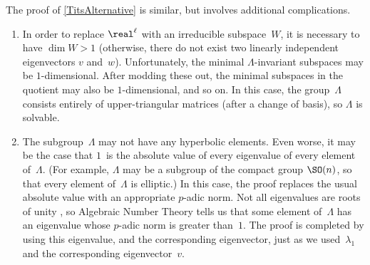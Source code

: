 \begin{rem}
 The proof of \cref{TitsAlternative} is similar, but
involves additional complications.
 \begin{enumerate}
 \item In order to replace $\real^\ell$ with an
irreducible subspace~$W$, it is necessary to have $\dim W >
1$ (otherwise, there do not exist two linearly independent
eigenvectors $v$ and~$w$). Unfortunately, the minimal
$\Lambda$-invariant subspaces may be $1$-dimensional. 
After modding these out, the minimal subspaces in the
quotient may also be $1$-dimensional, and so on. In this
case, the group~$\Lambda$ consists entirely of
upper-triangular matrices (after a change of basis), so
$\Lambda$ is solvable.
 \item The subgroup~$\Lambda$ may not have any hyperbolic
elements. Even worse, it may be the case that $1$~is the
absolute value of every eigenvalue of every element
of~$\Lambda$. (For example, $\Lambda$ may be a subgroup of
the compact group $\SO(n)$, so that every element
of~$\Lambda$ is elliptic.) In this case, the proof replaces the
usual absolute value with an appropriate $p$-adic norm.
Not all eigenvalues are roots of unity , so
Algebraic Number Theory tells us that some element
of~$\Lambda$ has an eigenvalue whose $p$-adic norm is
greater than~$1$. The proof is completed by using this eigenvalue, and the
corresponding eigenvector, just as we used~$\lambda_1$ and
the corresponding eigenvector~$v$.
 \end{enumerate}
 \end{rem}

